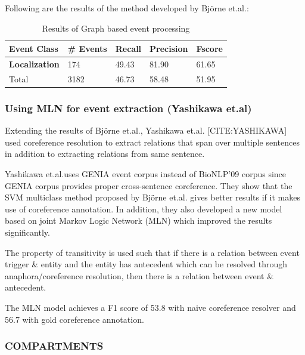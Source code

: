 Following are the results of the method developed by Björne et.al.:

\begin{table}[h]
\centering
\begin{tabular}{|l|l|l|l|l|}
\hline
\textbf{Event Class} & \textbf{\# Events} & \textbf{Recall} & \textbf{Precision} & \textbf{Fscore} \\ \hline
\textbf{Localization} & 174 & 49.43 & 81.90 & 61.65 \\
Total & 3182 & 46.73 & 58.48 & 51.95\\ \hline
\end{tabular}
\caption{Results of Graph based event processing}
\end{table}

\subsubsection*{Using MLN for event extraction (Yashikawa et.al)}

Extending the results of Björne et.al., Yashikawa et.al. [CITE:YASHIKAWA] used coreference resolution to extract relations that span over multiple sentences in 
addition to extracting relations from same sentence. 

Yashikawa et.al.uses GENIA event corpus instead of BioNLP'09 corpus since GENIA corpus provides proper cross-sentence coreference. They show that the SVM multiclass method proposed by Bj{\"o}rne et.al. gives better results if it makes use of coreference annotation. In addition, they also developed a new model based on joint Markov Logic Network (MLN) which improved the results significantly.

The property of transitivity is used such that if there is a relation between event trigger \& entity and the entity has antecedent which can be resolved through anaphora/coreference resolution, then there is a relation between event \& antecedent.


The MLN model achieves a F1 score of 53.8 with naive coreference resolver and 56.7 with gold coreference annotation. 

\subsubsection*{COMPARTMENTS}


